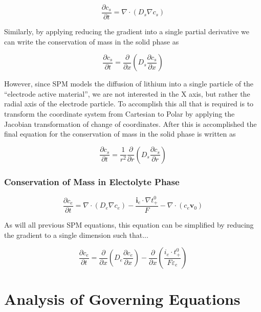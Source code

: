\documentclass[lettersize,journal]{IEEEtran}
\begin{document}
\begin{equation}
\frac{\partial c_{s}}{\partial t}=\nabla \cdot\left(D_{s} \nabla c_{s}\right)
\end{equation}

Similarly, by applying reducing the gradient into a single partial derivative we can write the conservation of mass in the solid phase as

\begin{equation}
\frac{\partial c_{s}}{\partial t}=  \frac{\partial}{\partial{x}} \left( D_s \frac{\partial{c_s}}{\partial{x}} \right)
\end{equation}

However, since SPM models the diffusion of lithium into a single particle of the ``electrode active material'', we are not interested in the X axis, but rather the radial axis of the electrode particle. To accomplish this all that is required is to transform the coordinate system from Cartesian to Polar by applying the Jacobian transformation of change of coordinates. After this is accomplished the final equation for the conservation of mass in the solid phase is written as

\begin{equation}
\frac{\partial c_{s}}{\partial t}= \frac{1}{r^2} \frac{\partial}{\partial{r}} \left( D_s \frac{\partial{c_s}}{\partial{r}} \right)
\end{equation}

\subsubsection{Conservation of Mass in Electolyte Phase}


\begin{equation}
\frac{\partial c_{e}}{\partial t}=\nabla \cdot\left(D_{e} \nabla c_{e}\right)-\frac{\mathbf{i}_{e} \cdot \nabla t_{+}^{0}}{F}-\nabla \cdot\left(c_{e} \mathbf{v}_{0}\right)
\end{equation}

As will all previous SPM equations, this equation can be simplified by reducing the gradient to a single dimension such that...

\begin{equation}
\frac{\partial c_{e}}{\partial t}= \frac{\partial}{\partial{x}} \left( D_e \frac{\partial{c_e}}{\partial{x}} \right) - \frac{\partial}{\partial{x}}\left( \frac{i_e \cdot t_{+}^{0}}{F\varepsilon_e} \right)
\end{equation}

\section{Analysis of Governing Equations}
\end{document}
